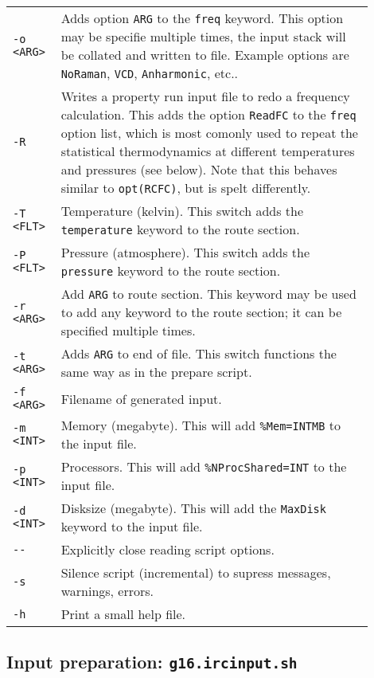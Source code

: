 \documentclass[   %
  final,          %
  a4paper         %
]{article}
\begin{document}
\begin{longtable}{p{0.1\linewidth}p{0.8\linewidth}}
  {\lstinline`-o <ARG>`} & Adds option {\lstinline`ARG`} to the \texttt{freq} keyword. 
    This option may be specifie multiple times, the input stack will be collated and written to file.
    Example options are \texttt{NoRaman}, \texttt{VCD}, \texttt{Anharmonic}, etc.. \\
  {\lstinline`-R`}       & Writes a property run input file to redo a frequency calculation.
    This adds the option \texttt{ReadFC} to the \texttt{freq} option list,
    which is most comonly used to repeat the statistical thermodynamics at
    different temperatures and pressures (see below). 
    Note that this behaves similar to \texttt{opt(RCFC)}, but is spelt differently. \\
  {\lstinline`-T <FLT>`} & Temperature (kelvin). This switch adds the \texttt{temperature} keyword to the route section. \\
  {\lstinline`-P <FLT>`} & Pressure (atmosphere). This switch adds the \texttt{pressure} keyword to the route section. \\
  {\lstinline`-r <ARG>`} & Add {\lstinline`ARG`} to route section. 
    This keyword may be used to add any keyword to the route section; 
    it can be specified multiple times.\\
  {\lstinline`-t <ARG>`} & Adds {\lstinline`ARG`} to end of file. 
    This switch functions the same way as in the prepare script. \\
  {\lstinline`-f <ARG>`} & Filename of generated input. \\
  {\lstinline`-m <INT>`} & Memory (megabyte). This will add \texttt{\%Mem={\lstinline`INT`}MB} to the input file. \\
  {\lstinline`-p <INT>`} & Processors. This will add \texttt{\%NProcShared={\lstinline`INT`}} to the input file. \\
  {\lstinline`-d <INT>`} & Disksize (megabyte). This will add the \texttt{MaxDisk} keyword to the input file. \\
  {\lstinline`--`}       & Explicitly close reading script options. \\
  {\lstinline`-s`}       & Silence script (incremental) to supress messages, warnings, errors. \\
  {\lstinline`-h`}       & Print a small help file. \\
\end{longtable}

\subsection{Input preparation: \texorpdfstring{{\lstinline`g16.ircinput.sh`}}{g16.ircinput.sh}}
\end{document}
